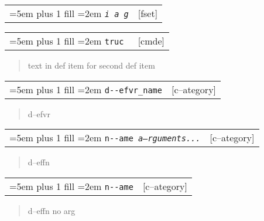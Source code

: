 \documentclass{book}
\newcommand\GNUTexinfocommandstyletextvar[1]{{\normalfont{}\textsl{#1}}}%
\begin{document}
%


\noindent\begin{tabularx}{\linewidth}{@{}Xr}
\rightskip=5em plus 1 fill
\hangindent=2em
\texttt{\GNUTexinfocommandstyletextvar{i} \EmbracOn{}\textnormal{\textsl{a g}}\EmbracOff{}}& [fset]
\end{tabularx}

\index[fn]{i@\texttt{\GNUTexinfocommandstyletextvar{i}}}%

\noindent\begin{tabularx}{\linewidth}{@{}Xr}
\rightskip=5em plus 1 fill
\hangindent=2em
\texttt{truc \EmbracOn{}\textnormal{\textsl{}}\EmbracOff{}}& [cmde]
\end{tabularx}

%
\begin{quote}
\unskip{\parskip=0pt\noindent}%
text in def item for second def item
\end{quote}



\noindent\begin{tabularx}{\linewidth}{@{}Xr}
\rightskip=5em plus 1 fill
\hangindent=2em
\texttt{d{-}{-}efvr\_name}& [c--ategory]
\end{tabularx}

%
\begin{quote}
\unskip{\parskip=0pt\noindent}%
d--efvr
\end{quote}


\noindent\begin{tabularx}{\linewidth}{@{}Xr}
\rightskip=5em plus 1 fill
\hangindent=2em
\texttt{n{-}{-}ame \EmbracOn{}\textnormal{\textsl{a--rguments...}}\EmbracOff{}}& [c--ategory]
\end{tabularx}

%
\begin{quote}
\unskip{\parskip=0pt\noindent}%
d--effn
\end{quote}


\noindent\begin{tabularx}{\linewidth}{@{}Xr}
\rightskip=5em plus 1 fill
\hangindent=2em
\texttt{n{-}{-}ame}& [c--ategory]
\end{tabularx}

%
\begin{quote}
\unskip{\parskip=0pt\noindent}%
d--effn no arg
\end{quote}
\end{document}
